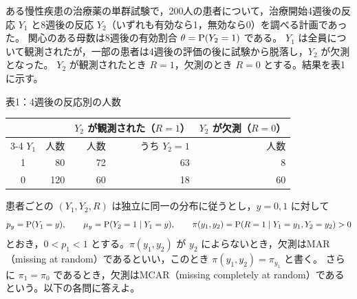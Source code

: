 \documentclass[a4paper,10pt]{ltjsarticle}
\begin{document}
ある慢性疾患の治療薬の単群試験で，200人の患者について，治療開始4週後の反応 $Y_1$ と8週後の反応 $Y_2$（いずれも有効なら1，無効なら0）を調べる計画であった。
関心のある母数は8週後の有効割合 $\theta=\operatorname{P}(Y_2=1)$ である。
$Y_1$ は全員について観測されたが，一部の患者は4週後の評価の後に試験から脱落し，$Y_2$ が欠測となった。
$Y_2$ が観測されたとき $R=1$，欠測のとき $R=0$ とする。結果を表1に示す。
\begin{center}
表1：4週後の反応別の人数\par\smallskip
\begin{tabular}{crrrr}
\toprule
 & & \multicolumn{2}{c}{$Y_2$ が観測された（$R=1$）} & $Y_2$ が欠測（$R=0$）\\
\cmidrule(lr){3-4}
$Y_1$ & 人数 & 人数 & うち $Y_2=1$ & 人数\\
\midrule
1 & 80 & 72 & 63 & 8\\
0 & 120 & 60 & 18 & 60\\
\bottomrule
\end{tabular}
\end{center}
患者ごとの $(Y_1,Y_2,R)$ は独立に同一の分布に従うとし，$y=0,1$ に対して
\[
p_y=\operatorname{P}(Y_1=y),\qquad \mu_y=\operatorname{P}(Y_2=1\mid Y_1=y),\qquad
\pi(y_1,y_2)=\operatorname{P}(R=1\mid Y_1=y_1,Y_2=y_2)>0
\]
とおき，$0<p_1<1$ とする。$\pi(y_1,y_2)$ が $y_2$ によらないとき，欠測はMAR（missing at random）であるといい，このとき $\pi(y_1,y_2)=\pi_{y_1}$ と書く。
さらに $\pi_1=\pi_0$ であるとき，欠測はMCAR（missing completely at random）であるという。以下の各問に答えよ。
\end{document}
